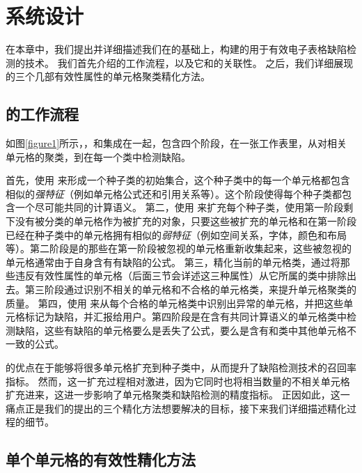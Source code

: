 \chapter{系统设计}

在本章中，我们提出并详细描述我们在\cu 的基础上，构建的用于有效电子表格缺陷检测的技术\wa 。
我们首先介绍\wa 的工作流程，以及它和\cu 的关联性。
之后，我们详细展现\wa 的三个几部有效性属性的单元格聚类精化方法。

\section{\wa 的工作流程}



如图\ref{figure1}所示，\wa ，和\cu 集成在一起，包含四个阶段，在一张工作表里，从对相关单元格的聚类，到在每一个类中检测缺陷。

首先，\wa 使用 \cu 来形成一个种子类的初始集合，这个种子类中的每一个单元格都包含相似的\textit{强特征}（例如单元格公式还和引用关系等）。这个阶段使得每个种子类都包含一个尽可能共同的计算语义。
第二，\wa 使用 \cu 来扩充每个种子类，使用第一阶段剩下没有被分类的单元格作为被扩充的对象，只要这些被扩充的单元格和在第一阶段已经在种子类中的单元格拥有相似的\textit{弱特征}（例如空间关系，字体，颜色和布局等）。第二阶段是的那些在第一阶段被忽视的单元格重新收集起来，这些被忽视的单元格通常由于自身含有有缺陷的公式。
第三，\wa 精化当前的单元格类，通过将那些违反有效性属性的单元格（后面三节会详述这三种属性）从它所属的类中排除出去。第三阶段通过识别不相关的单元格和不合格的单元格类，来提升单元格聚类的质量。
第四，\wa 使用 \cu 来从每个合格的单元格类中识别出异常的单元格，并把这些单元格标记为缺陷，并汇报给用户。第四阶段是在含有共同计算语义的单元格类中检测缺陷，这些有缺陷的单元格要么是丢失了公式，要么是含有和类中其他单元格不一致的公式。

\cu 的优点在于能够将很多单元格扩充到种子类中，从而提升了缺陷检测技术的召回率指标\cite{cheung2016custodes}。
然而，这一扩充过程相对激进，因为它同时也将相当数量的不相关单元格扩充进来，这进一步影响了单元格聚类和缺陷检测的精度指标。
正因如此，这一痛点正是我们的\wa 提出的三个精化方法想要解决的目标，接下来我们详细描述精化过程的细节。

\section{单个单元格的有效性精化方法}



